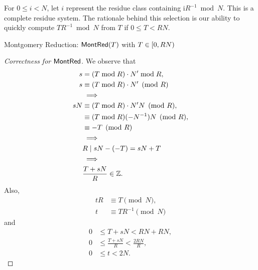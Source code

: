 For $0\leq i < N$, let $i$ represent the residue class containing i$R^{-1}\bmod N$. This is a
complete residue system.  The rationale behind this selection is our ability to quickly
compute $TR^{-1}\bmod N$ from $T$ if $0\leq T < RN$.

\vspace{16pt}
\begin{algorithm}[H]
\DontPrintSemicolon
\caption{Montgomery Reduction: $\mathsf{MontRed}(T)$ with $T\in\intco{0,RN}$}
\BlankLine
{}
\BlankLine
{}
\end{algorithm}

\begin{proof}[Correctness for $\mathsf{MontRed}$]
We observe that
\begin{align*}
	s&=(T\bmod R)\cdot N'\bmod {R}, \\
	s&\equiv(T\bmod {R})\cdot N'\pmod {R}\\
	&\implies\\
	sN&\equiv(T\bmod {R})\cdot N'N\pmod {R}, \\
	&\equiv (T\bmod {R})(-N^{-1})N\pmod {R}, \\
	&\equiv -T\pmod{R}\\
	&\implies\\ 
	&R\mid sN-(-T)=sN+T\\
	&\implies\\ 
	&\frac{T+sN}{R}\in\mathbb{Z}.
\end{align*}
Also, \begin{align*}
tR&\equiv T\pmod{N},\\
t&\equiv TR^{-1}\pmod{N}
\end{align*} and
\begin{align*}
	0&\leq T+sN<RN+RN,\\
	0&\leq \frac{T+sN}{R}<\frac{2RN}{R},\\
	0&\leq t< 2N.
\end{align*}
\end{proof}

\newpage
